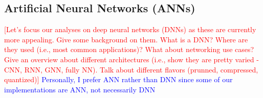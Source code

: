 \subsection{Artificial Neural Networks (ANNs)}
\textcolor{red}{[Let's focus our analyses on deep neural networks (DNNs) as these are currently more appealing. Give some background on them. What is a DNN? Where are they used (i.e., most common applications)? What about networking use cases? Give an overview about different architectures (i.e., show they are pretty varied - CNN, RNN, GNN, fully  NN). Talk about different flavors (prunned, compressed, quantized)]}
\textcolor{blue}{Personally, I prefer ANN rather than DNN since some of our implementations are ANN, not necessarily DNN}

